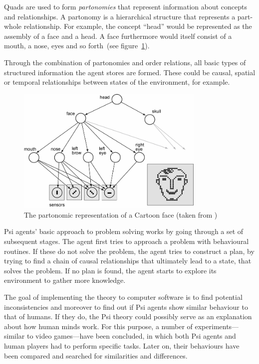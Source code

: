 Quads are used to form \emph{partonomies} that represent information about concepts and relationships. A partonomy is a hierarchical structure that represents a part-whole relationship. For example, the concept ``head'' would be represented as the assembly of a face and a head. A face furthermore would itself consist of a mouth, a nose, eyes and so forth~(see figure~\ref{partonomy}). 

Through the combination of partonomies and order relations, all basic types of structured information the agent stores are formed. These could be causal, spatial or temporal relationships between states of the environment, for example.

\begin{figure}[h]
  \centering
    \includegraphics[width=9cm]{graphics/partonomy}
  \caption[The partonomic representation of a Cartoon face]{The partonomic representation of a Cartoon face (taken from \cite{Bach:2009:PSI:1611304})}
  \label{partonomy}
\end{figure}

Psi agents' basic approach to problem solving works by going through a set of subsequent stages. The agent first tries to approach a problem with behavioural routines. If these do not solve the problem, the agent tries to construct a plan, by trying to find a chain of causal relationships that ultimately lead to a state, that solves the problem. If no plan is found, the agent starts to explore its environment to gather more knowledge.

The goal of implementing the theory to computer software is to find potential inconsistencies and moreover to find out if Psi agents show similar behaviour to that of humans. If they do, the Psi theory could possibly serve as an explanation about how human minds work. For this purpose, a number of experiments---similar to video games---have been concluded, in which both Psi agents and human players had to perform specific tasks. Later on, their behaviours have been compared and searched for similarities and differences.

